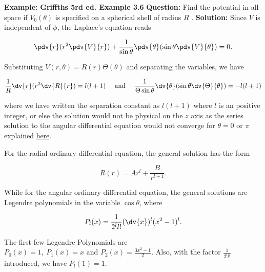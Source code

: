 \documentclass[a4paper,12pt]{report}
\begin{document}
	\begin{example_template}
		\textbf{Example:} \textbf{Griffths 5rd ed. Example 3.6} \newline \newline
		\textbf{Question:} Find the potential in all space if \(V_0(\theta )\) is specified on a spherical shell of radius \(R\) .  \newline \newline
		\textbf{Solution:}  Since \(V\) is independent of \(\phi \), the Laplace's equation reads 
		
		\begin{equation}
			\pdv{r} (r^2 \pdv{V}{r} ) + \frac{1}{\sin \theta } \pdv{\theta } (\sin \theta \pdv{V}{\theta } ) = 0.
		\end{equation}
		
		Substituting \(V(r,\theta ) = R(r)\Theta (\theta )\) and separating the variables, we have 
		
		\begin{equation}
			\frac{1}{R} \dv{r} (r^2 \dv{R}{r} ) = l(l+1) ~~~ \text{ and } ~~~ \frac{1}{\Theta \sin \theta } \dv{\theta } (\sin \theta \dv{\Theta }{\theta } ) = -l(l+1)	
		\end{equation}
		
		where we have written the separation constant as \(l(l+1)\) where \(l\) is an positive integer, or else the solution would not be physical on the \(z\) axis as the series solution to the angular differential equation would not converge for \(\theta = 0 \text { or }  \pi \) explained \href{https://jfoadi.me.uk/documents/lecture_mathphys2_08.pdf}{here}.
		
		For the radial ordinary differential equation, the general solution has the form
		
		\begin{equation}
			R(r) = Ar^{l} + \frac{B}{r^{l+1} } .
		\end{equation}
		
		While for the angular ordinary differential equation, the general solutions are Legendre polynomials in the variable \(\cos \theta \), where 
		
		\begin{equation}
			P_{l}(x) = \frac{1}{2^{l} l!} (\dv{x} )^{l} (x^2 - 1)^{l} . 
		\end{equation}
		
		The first few Legendre Polynomials are \(P_0(x) = 1, ~P_1(x) = x \text{ and } P_2(x) = \frac{3x^2 - 1}{2} \). Also, with the factor \(\frac{1}{2^{l} l!} \) introduced, we have \(P_{l} (1) = 1\).  
		

\end{example_template}
\end{document}
